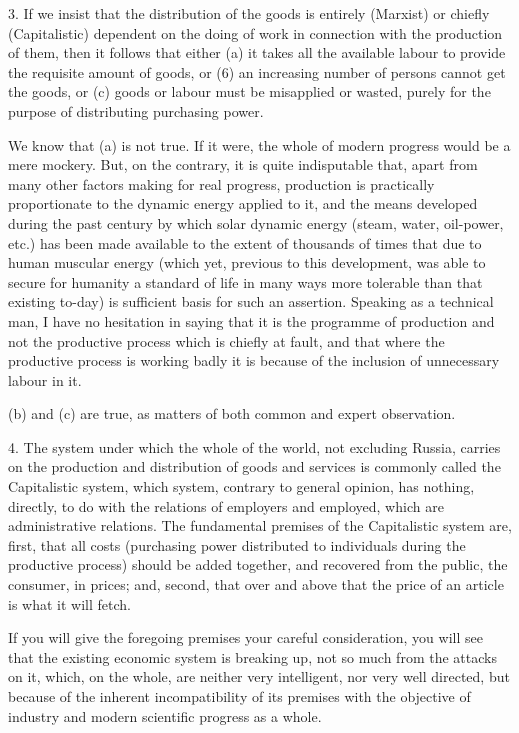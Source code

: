 \documentclass{book}
\begin{document}
3. If we insist that the distribution of the goods is entirely (Marxist) or chiefly (Capitalistic) dependent on the doing of work in connection with the production of them, then it follows that either (a) it takes all the available labour to provide the requisite amount of goods, or (6) an increasing number of persons cannot get the goods, or (c) goods or labour must be misapplied or wasted, purely for the purpose of distributing purchasing power.

We know that (a) is not true. If it were, the whole of modern progress would be a mere mockery. But, on the contrary, it is quite indisputable that, apart from many other factors making for real progress, production is practically proportionate to the dynamic energy applied to it, and the means developed during the past century by which solar dynamic energy (steam, water, oil-power, etc.) has been made available to the extent of thousands of times that due to human muscular energy (which yet, previous to this development, was able to secure for humanity a standard of life in many ways more tolerable than that existing to-day) is sufficient basis for such an assertion. Speaking as a technical man, I have no hesitation in saying that it is the programme of production and not the productive process which is chiefly at fault, and that where the productive process is working badly it is because of the inclusion of unnecessary labour in it.

(b) and (c) are true, as matters of both common and expert observation.

4. The system under which the whole of the world, not excluding Russia, carries on the production and distribution of goods and services is commonly called the Capitalistic system, which system, contrary to general opinion, has nothing, directly, to do with the relations of employers and employed, which are administrative relations. The fundamental premises of the Capitalistic system are, first, that all costs (purchasing power distributed to individuals during the productive process) should be added together, and recovered from the public, the consumer, in prices; and, second, that over and above that the price of an article is what it will fetch.

If you will give the foregoing premises your careful consideration, you will see that the existing economic system is breaking up, not so much from the attacks on it, which, on the whole, are neither very intelligent, nor very well directed, but because of the inherent incompatibility of its premises with the objective of industry and modern scientific progress as a whole.
\end{document}
